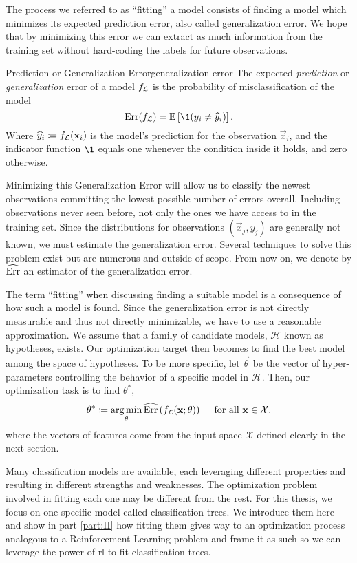 The process we referred to as ``fitting'' a model consists of finding a model
which minimizes its expected prediction error, also called generalization error.
We hope that by minimizing this error we can extract as much information from
the training set without hard-coding the labels for future observations.

\begin{dfn}{Prediction or Generalization Error}{generalization-error}
    The expected \emph{prediction} or \emph{generalization} error of a model
    $f_{\mathcal{L}}$ is the probability of misclassification of the model
    \[
        \Err (f_\L) = \mathbb{E} \left[ \1 (y_i \neq \widehat{y}_i)  \right].
    \]
    Where $\widehat{y}_i \coloneqq f_{\mathcal{L}} (\mathbf{x}_i)$ is the model's prediction
    for the observation $\vec{x}_i$, and the indicator function $\1$ equals one
    whenever the condition inside it holds, and zero otherwise.
\end{dfn}

Minimizing this Generalization Error will allow us to classify the newest
observations committing the lowest possible number of errors overall.
Including observations never seen before, not only the ones we have access to in
the training set. Since the distributions for observations $(\vec{x}_j, y_j)$
are generally not known, we must estimate the generalization error. Several
techniques to solve this problem exist but are numerous and outside of scope.
From now on, we denote by $\widehat{\operatorname*{Err}}$ an estimator of the generalization
error.

The term ``fitting'' when discussing finding a suitable model is a consequence
of how such a model is found. Since the generalization error is not directly
measurable and thus not directly minimizable, we have to use a reasonable
approximation. We assume that a family of candidate models, $\mathcal{H}$ known
as hypotheses, exists. Our optimization target then becomes to find the best
model among the space of hypotheses. To be more specific, let $\vec{\theta}$ be
the vector of hyper-parameters controlling the behavior of a specific model in
$\mathcal{H}$.  Then, our optimization task is to find $\theta^{*}$,
\[
    \theta^{*} \coloneqq \operatorname*{arg\,min}_{\theta} \widehat{\operatorname*{Err}}\left(f_{\mathcal{L}} (\mathbf{x}; \theta) \right) \quad \text{ for all } \mathbf{x} \in \mathcal{X}.
\]
where the vectors of features come from the input space $\mathcal{X}$ defined
clearly in the next section.

Many classification models are available, each leveraging different properties
and resulting in different strengths and weaknesses. The optimization problem
involved in fitting each one may be different from the rest. For this thesis, we
focus on one specific model called classification trees. We introduce them here
and show in part \ref{part:II} how fitting them gives way to an optimization
process analogous to a Reinforcement Learning problem and frame it as such so we
can leverage the power of \ac{rl} to fit classification trees.

